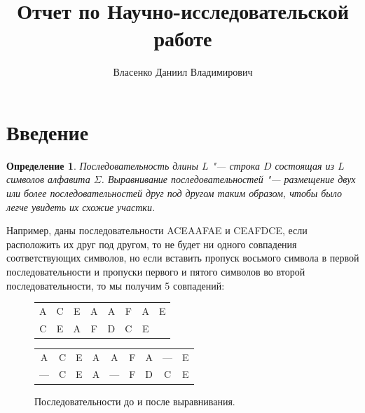 \documentclass[specialist,
substylefile = spbu_report.rtx,
subf,href,colorlinks=true, 12pt]{disser}
\newtheorem{defenition}{Определение}
\begin{document}
	
	\title{Отчет по Научно-исследовательской работе}	
	\author{Власенко Даниил Владимирович}
	\date{\number\year}	
	\maketitle
	
	
	\section{Введение}
		\begin{defenition}
		Последовательность длины $L$ "--- строка $D$ состоящая из $L$ символов алфавита $\Sigma$. Выравнивание последовательностей  "--- размещение двух или более последовательностей друг под другом таким образом, чтобы было легче увидеть их схожие участки. 
		\end{defenition}
		Например, даны последовательности ACEAAFAE и CEAFDCE, если расположить их друг под другом, то не будет ни одного совпадения соответствующих символов, но если вставить пропуск восьмого символа в первой последовательности и пропуски первого и пятого символов во второй последовательности, то мы получим 5 совпадений:
		
		\begin{figure}[h]
			\centering			
			\begin{tabular}{cccccccc}
				A&C&E&A&A&F&A&E\\
				C&E&A&F&D&C&E&\\
			\end{tabular}
		\end{figure}
		\begin{figure}[h]
			\centering			
			\begin{tabular}{ccccccccc}
				A&C&E&A&A&F&A&—&E\\
				—&C&E&A&—&F&D&C&E\\
			\end{tabular}
		\caption{Последовательности до и после выравнивания.} \label{fg:1}
		\end{figure}
	
\end{document}
